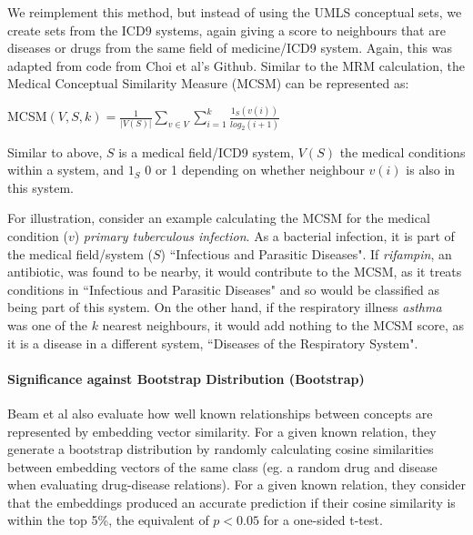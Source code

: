 \documentclass[11pt,a4paper]{article}
\begin{document}
We reimplement this method, but instead of using the UMLS conceptual sets, we create sets from the ICD9 systems, again giving a score to neighbours that are diseases or drugs from the same field of medicine/ICD9 system. Again, this was adapted from code from Choi et al's Github. Similar to the MRM calculation, the Medical Conceptual Similarity Measure (MCSM) can be represented as:

MCSM$(V,S,k) = \frac{1}{|V(S)|}\sum\limits_{v\in V}\sum\limits_{i=1}^k \frac{1_S(v(i))}{log_2(i+1)}$

Similar to above, $S$ is a medical field/ICD9 system, $V(S)$ the medical conditions within a system, and $1_S$ 0 or 1 depending on whether neighbour $v(i)$ is also in this system. 

For illustration, consider an example calculating the MCSM for the medical condition ($v$) \emph{primary tuberculous infection}. As a bacterial infection, it is part of the medical field/system ($S$) ``Infectious and Parasitic Diseases". If \emph{rifampin}, an antibiotic, was found to be nearby, it would contribute to the MCSM, as it treats conditions in ``Infectious and Parasitic Diseases" and so would be classified as being part of this system. On the other hand, if the respiratory illness \emph{asthma} was one of the $k$ nearest neighbours, it would add nothing to the MCSM score, as it is a disease in a different system, ``Diseases of the Respiratory System". 

%

\paragraph{Significance against Bootstrap Distribution (Bootstrap)}
Beam et al  also evaluate how well known relationships between concepts are represented by embedding vector similarity. For a given known relation, they generate a bootstrap distribution by randomly calculating cosine similarities between embedding vectors of the same class (eg. a random drug and disease when evaluating  drug-disease relations). For a given known relation, they consider that the embeddings produced an accurate prediction if their cosine similarity is within the top 5\%, the equivalent of $p<0.05$ for a one-sided t-test. 
\end{document}
